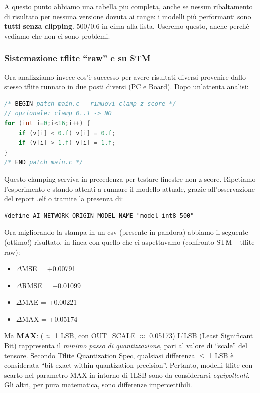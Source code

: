 A questo punto abbiamo una tabella piu completa, anche se nessun ribaltamento di risultato per nessuna versione dovuta ai range: i modelli più performanti sono \textbf{tutti senza clipping}. 500/0.6 in cima alla lista. Useremo questo, anche perchè vediamo che non ci sono problemi.

\subsubsection{Sistemazione tflite ``raw'' e su STM}
Ora analizziamo invece cos'è successo per avere risultati diversi provenire dallo stesso tflite runnato in due posti diversi (PC e Board). Dopo un'attenta analisi:

\begin{lstlisting}[language=C]
/* BEGIN patch main.c - rimuovi clamp z-score */
// opzionale: clamp 0..1 -> NO
for (int i=0;i<16;i++) {
    if (v[i] < 0.f) v[i] = 0.f;
    if (v[i] > 1.f) v[i] = 1.f;
}
/* END patch main.c */
\end{lstlisting}

Questo clamping serviva in precedenza per testare finestre non z-score. Ripetiamo l’esperimento e stando attenti a runnare il modello attuale, grazie all’osservazione del report .elf o tramite la presenza di:

\begin{verbatim}
#define AI_NETWORK_ORIGIN_MODEL_NAME "model_int8_500"
\end{verbatim}

Ora migliorando la stampa in un csv (presente in pandora) abbiamo il seguente (ottimo!) risultato, in linea con quello che ci aspettavamo (confronto STM – tflite raw):

\begin{itemize}
    \item $\Delta$MSE = +0.00791
    \item $\Delta$RMSE = +0.01099
    \item $\Delta$MAE = +0.00221
    \item $\Delta$MAX = +0.05174
\end{itemize}
Ma \textbf{MAX}: ($\approx$ 1 LSB, con OUT\_SCALE $\approx$ 0.05173)
L’LSB (Least Significant Bit) rappresenta il \textit{minimo passo di quantizzazione}, pari al valore di ``scale'' del tensore. Secondo Tflite Quantization Spec, qualsiasi differenza $\leq$ 1 LSB è considerata ``bit-exact within quantization precision''. Pertanto, modelli tflite con scarto nel parametro MAX in intorno di 1LSB sono da considerarsi \textit{equipollenti}. Gli altri, per pura matematica, sono differenze impercettibili.

